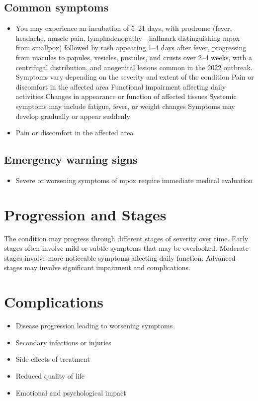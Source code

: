 \subsection{Common symptoms}
\begin{itemize}[noitemsep]
  \item You may experience an incubation of 5--21 days, with prodrome (fever, headache, muscle pain, lymphadenopathy---hallmark distinguishing mpox from smallpox) followed by rash appearing 1--4 days after fever, progressing from macules to papules, vesicles, pustules, and crusts over 2--4 weeks, with a centrifugal distribution, and anogenital lesions common in the 2022 outbreak. Symptoms vary depending on the severity and extent of the condition Pain or discomfort in the affected area Functional impairment affecting daily activities Changes in appearance or function of affected tissues Systemic symptoms may include fatigue, fever, or weight changes Symptoms may develop gradually or appear suddenly
  \item Pain or discomfort in the affected area
  \end{itemize}

\subsection{Emergency warning signs}
\begin{itemize}[noitemsep]
  \item Severe or worsening symptoms of mpox require immediate medical evaluation
\end{itemize}
\section{Progression and Stages}
The condition may progress through different stages of severity over time. Early stages often involve mild or subtle symptoms that may be overlooked. Moderate stages involve more noticeable symptoms affecting daily function. Advanced stages may involve significant impairment and complications.
\section{Complications}
\begin{itemize}[noitemsep]
  \item Disease progression leading to worsening symptoms
  \item Secondary infections or injuries
  \item Side effects of treatment
  \item Reduced quality of life
  \item Emotional and psychological impact
\end{itemize}
